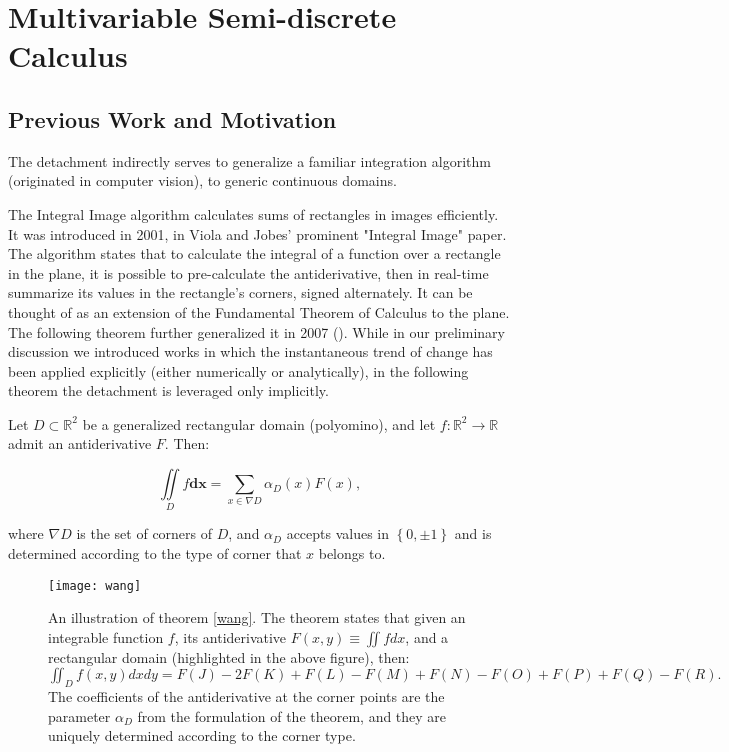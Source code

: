 \documentclass[11pt]{book}
\begin{document}
\chapter{Multivariable Semi-discrete Calculus}

\section{Previous Work and Motivation}
The detachment indirectly serves to generalize a familiar integration algorithm (originated in computer vision), to generic continuous domains. 

The Integral Image algorithm calculates sums of rectangles in images efficiently. It was introduced in 2001, in Viola and Jobes' prominent "Integral Image" paper. The algorithm states that to calculate the integral of a function over a rectangle in the plane, it is possible to pre-calculate the antiderivative, then in real-time summarize its values in the rectangle’s corners, signed alternately. It can be thought of as an extension of the Fundamental Theorem of Calculus to the plane. The following theorem further generalized it in 2007 (\cite{wang2007shape}). While in our preliminary discussion we introduced works in which the instantaneous trend of change has been applied explicitly (either numerically or analytically), in the following theorem the detachment is leveraged only implicitly.

\begin{theorem}[Wang et al.]Let $D\subset\mathbb{R}^{2}$ be a generalized rectangular domain (polyomino), and let $f:\mathbb{R}^{2}\rightarrow\mathbb{R}$ admit an antiderivative $F.$ Then:

$$\underset{{\scriptscriptstyle D}}{\iint}f\boldsymbol{dx}=\underset{{\scriptscriptstyle x\in\nabla D}}{\sum}\alpha_{D}\left(x\right)F\left(x\right),$$

where $\nabla D$ is the set of corners of $D$, and $\alpha_{D}$ accepts values in $\left\{ 0,\pm1\right\} $ and is determined according to the type of corner that $x$ belongs to.
\label{wang}
\end{theorem}

\begin{figure}
\texttt{[image: wang]}
\caption{An illustration of theorem \ref{wang}. The theorem states that given an integrable function $f$, its antiderivative $F\left(x,y\right)\equiv\iint f dx$, and a rectangular domain (highlighted in the above figure), then: $\iint_{D}f(x,y)dxdy=F(J)-2F(K)+F(L)-F(M)+F(N)-F(O)+F(P)+F(Q)-F(R).$ The coefficients of the antiderivative at the corner points are the parameter $\alpha_{D}$ from the formulation of the theorem, and they are uniquely determined according to the corner type.}
\end{figure}
\end{document}
